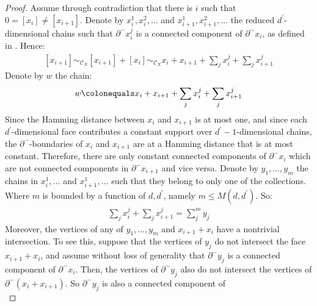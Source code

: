 \begin{proof}
  Assume through contradiction that there is $i$ such that $0 = [x_{i}] \neq [x_{i+1}]$. Denote by $x_{i}^{1}, x_{i}^{2}, \ldots$ and $x_{i+1}^{1}, x_{i+1}^{2}, \ldots$ the reduced $d^{\prime}$-dimensional chains such that $\partial^{-}x_{i}^{j}$ is a connected component of $\partial^{-}x_{i}$, as defined in . Hence:
  \begin{equation*}
    \begin{split}
      [x_{i+1}] \sim_{\mathcal{C}_{X}} [x_{i+1}] + [x_{i}] \sim_{\mathcal{C}_{X}}  x_{i} + x_{i+1} + \sum_{j}x_{i}^{j} + \sum_{j}x_{i+1}^{j}
    \end{split}
  \end{equation*}
Denote by $w$ the chain:
  \begin{equation*}
    \begin{split}
      w \colonequals x_{i} + x_{i+1} + \sum_{j}x_{i}^{j} + \sum_{j}x_{i+1}^{j}
    \end{split}
  \end{equation*}
  Since the Hamming distance between $x_{i}$ and $x_{i+1}$ is at most one, and since each $d^{\prime}$-dimensional face contributes a constant support over $d^{\prime}-1$-dimensional chains, the $\partial^{-}$-boundaries of $x_{i}$ and $x_{i+1}$ are at a Hamming distance that is at most constant. Therefore, there are only constant connected components of $\partial^{-}x_{i}$ which are not connected components in $\partial^{-}x_{i+1}$ and vice versa. Denote by $y_{1}, \ldots, y_{m}$ the chains in $x_{i}^{1}, \ldots$ and $x_{i+1}^{1}, \ldots$ such that they belong to only one of the collections. Where $m$ is bounded by a function of $d,d^{\prime}$, namely $m \le M(d,d^{\prime})$. So:
  \begin{equation*}
    \begin{split}
      \sum_{j}x_{i}^{j} + \sum_{j}x_{i+1}^{j} = \sum_{j}^{m}y_{j}
    \end{split}
  \end{equation*}
Moreover, the vertices of any of $y_{1}, \ldots, y_{m}$ and $x_{i+1}+x_{i}$ have a nontrivial intersection. To see this, suppose that the vertices of $y_{j}$ do not intersect the face $x_{i+1}+x_{i}$, and assume without loss of generality that $\partial^{-}y_{j}$ is a connected component of $\partial^{-}x_{i}$. Then, the vertices of $\partial^{-}y_{j}$ also do not intersect the vertices of $\partial^{-}(x_{i} + x_{i+1})$. So $\partial^{-}y_{j}$ is also a connected component of
  \begin{equation*}

\end{equation*}
\end{proof}
